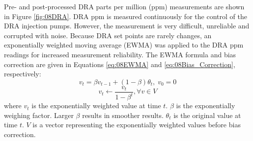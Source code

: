 Pre- and post-processed DRA parts per million (ppm) measurements are shown in Figure \ref{fig:08DRA}. DRA ppm is measured continuously for the control of the DRA injection pumps. However, the measurement is very difficult, unreliable and corrupted with noise. Because DRA set points are rarely changes, an exponentially weighted moving average (EWMA) was applied to the DRA ppm readings for increased measurement reliability.  The EWMA formula and bias correction are given in Equations \ref{eq:08EWMA} and \ref{eq:08Bias_Correction}, respectively: 
\begin{equation}
    v_t = \beta v_{t - 1} + (1 - \beta) \theta_t, \; v_0 = 0
    \label{eq:08EWMA}
\end{equation}
\begin{equation}
    v_t \leftarrow \frac{v_t}{1 - \beta^t}, \forall v \in V
    \label{eq:08Bias_Correction}
\end{equation}
where $v_{t}$ is the exponentially weighted value at time $t$.  $\beta$ is the exponentially weighing factor.  Larger $\beta$ results in smoother results.  $\theta_t$ is the original value at time $t$. $V$ is a vector representing the exponentially weighted values before bias correction.  

